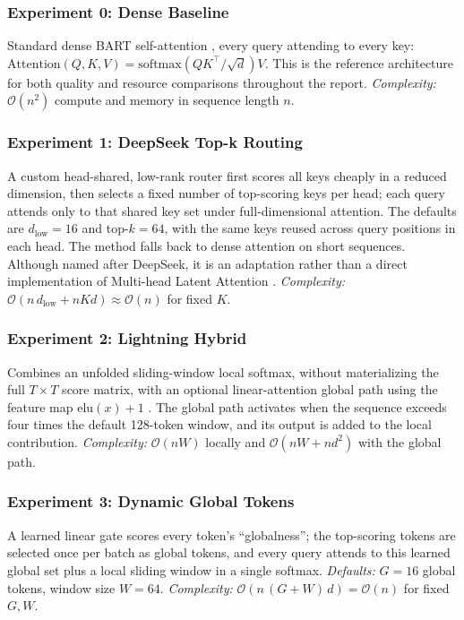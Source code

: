 \documentclass[11pt]{article}
\newcommand{\bigO}{\mathcal{O}}
\begin{document}
\subsubsection*{Experiment 0: Dense Baseline}
\label{exp:baseline}
Standard dense BART self-attention \citep{lewis2020bart}, every query attending to every key:
$\mathrm{Attention}(Q,K,V) = \mathrm{softmax}(QK^\top/\sqrt{d})V$. This is the
reference architecture for both quality and resource comparisons throughout
the report. \emph{Complexity:} $\bigO(n^2)$ compute and memory in sequence
length $n$.

\subsubsection*{Experiment 1: DeepSeek Top-k Routing}
\label{exp:deepseek}
A custom head-shared, low-rank router first scores all keys cheaply in a
reduced dimension, then selects a fixed number of top-scoring keys per head;
each query attends only to that shared key set under full-dimensional
attention. The defaults are $d_{\mathrm{low}}=16$ and top-$k=64$, with the
same keys reused across query positions in each head. The method falls back to
dense attention on short sequences. Although named after DeepSeek, it is an
adaptation rather than a direct implementation of Multi-head Latent Attention
\citep{deepseek2024v3}. \emph{Complexity:}
$\bigO(n\,d_{\mathrm{low}}+nKd)\approx\bigO(n)$ for fixed $K$.

\subsubsection*{Experiment 2: Lightning Hybrid}
\label{exp:lightning}
Combines an unfolded sliding-window local softmax, without materializing the
full $T\times T$ score matrix, with an optional linear-attention global path
using the feature map $\mathrm{elu}(x)+1$ \citep{qin2024lightning}. The global
path activates when the sequence exceeds four times the default 128-token
window, and its output is added to the local contribution.
\emph{Complexity:} $\bigO(nW)$ locally and $\bigO(nW+nd^2)$ with the global
path.

\subsubsection*{Experiment 3: Dynamic Global Tokens}
\label{exp:dynglobal}
A learned linear gate scores every token's ``globalness''; the top-scoring
tokens are selected once per batch as global tokens, and every query attends
to this learned global set plus a local sliding window in a single softmax.
\emph{Defaults:} $G=16$ global tokens, window size $W=64$.
\emph{Complexity:} $\bigO(n\,(G+W)\,d) = \bigO(n)$ for fixed $G,W$.
\end{document}
